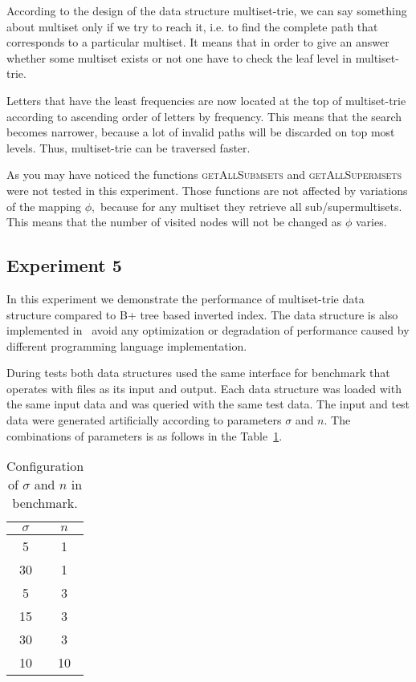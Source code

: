 According to the design of the data structure multiset-trie, we can say 
something about multiset only if we try to reach it, i.e. to find the complete 
path that corresponds to a particular multiset. It means that in order to give 
an answer whether some multiset exists or not one have to check the leaf level in 
multiset-trie. 

Letters that have the least frequencies are now located at the top of 
multiset-trie according to ascending order of letters by frequency. This means 
that the search becomes narrower, because a lot of invalid paths will be 
discarded on top most levels. Thus, multiset-trie can be traversed faster.

As you may have noticed the functions \textsc{getAllSubmsets} and 
\textsc{getAllSupermsets} were not tested in this experiment. Those functions 
are not affected by variations of the mapping $\phi,$ because for any multiset 
they retrieve all sub/supermultisets. This means that the number of visited 
nodes will not be changed as $\phi$ varies.

\subsection{Experiment 5} \label{s:exp5}
In this experiment we demonstrate the performance of multiset-trie data structure 
compared to B+ tree based inverted index. The data structure is also implemented 
in~ avoid any optimization or degradation of performance caused by different 
programming language implementation.


During tests both data structures used the same interface for benchmark that operates 
with files as its input and output. Each data structure was loaded with the same input data 
and was queried with the same test data. The input and test data were generated artificially 
according to parameters $\sigma$ and $n.$ The combinations of parameters is as follows in the 
Table~\ref{t:benchmark}.

\begin{table}[h]
\center
\begin{tabular}{|c|c|}
\hline
$\sigma$ & $n$ \\
\hline
5		& 1\\
\hline
30	& 1 \\
\hline
5		& 3 \\
\hline
15	& 3 \\
\hline
30	& 3 \\
\hline
10	& 10 \\
\hline
\end{tabular}
\caption{Configuration of $\sigma$ and $n$ in benchmark.}
\label{t:benchmark}
\end{table}

